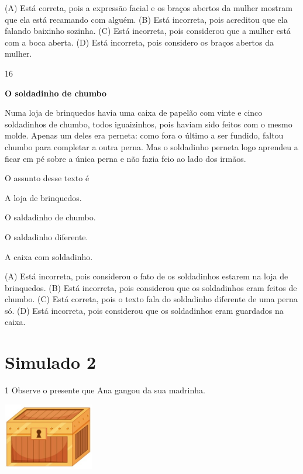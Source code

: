 (A) Está correta, pois a expressão facial e os braços abertos da mulher mostram que ela está recamando com alguém.
(B) Está incorreta, pois acreditou que ela falando baixinho sozinha.
(C) Está incorreta, pois considerou que a mulher está com a boca aberta.
(D) Está incorreta, pois considero os braços abertos da mulher.

\num{16}

\textbf{O soldadinho de chumbo}

Numa loja de brinquedos havia uma caixa de papelão com
vinte e cinco soldadinhos de chumbo, todos iguaizinhos, pois
haviam sido feitos com o mesmo molde. Apenas um deles
era perneta: como fora o último a ser fundido, faltou chumbo
para completar a outra perna. Mas o soldadinho perneta logo
aprendeu a ficar em pé sobre a única perna e não fazia feio ao
lado dos irmãos.


O assunto desse texto é

\begin{escolha}
\item A loja de brinquedos.

\item O saldadinho de chumbo.

\item O saldadinho diferente.

\item A caixa com soldadinho.
\end{escolha}


(A) Está incorreta, pois considerou o fato de os soldadinhos estarem na loja de brinquedos.
(B) Está incorreta, pois considerou que os soldadinhos eram feitos de chumbo.
(C) Está correta, pois o texto fala do soldadinho diferente de uma perna só.
(D) Está incorreta, pois considerou que os soldadinhos eram guardados na caixa.

\chapter{Simulado 2}

\num{1} Observe o presente que Ana gangou da sua madrinha.

\includegraphics[width=1.55556in,height=1.16111in]{media/image147.jpeg}

